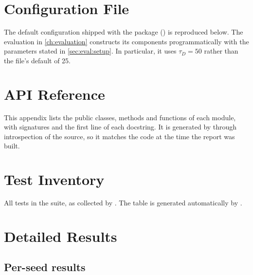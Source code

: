 \chapter{Configuration File}
\label{app:config}

The default configuration shipped with the package () is reproduced
below. The evaluation in \cref{ch:evaluation} constructs its components programmatically with the
parameters stated in \cref{sec:eval:setup}. In particular, it uses $\tau_D=50$ rather than the
file's default of 25.



\chapter{API Reference}
\label{app:api}

This appendix lists the public classes, methods and functions of each module, with signatures
and the first line of each docstring. It is generated by 
through introspection of the source, so it matches the code at the time the report was built.

{\small\sloppy\raggedright

\par}

\chapter{Test Inventory}
\label{app:tests}

All \NTests{} tests in the suite, as collected by . The table is generated
automatically by .

{\small\sloppy

\par}

\chapter{Detailed Results}
\label{app:results}

\section{Per-seed results}

